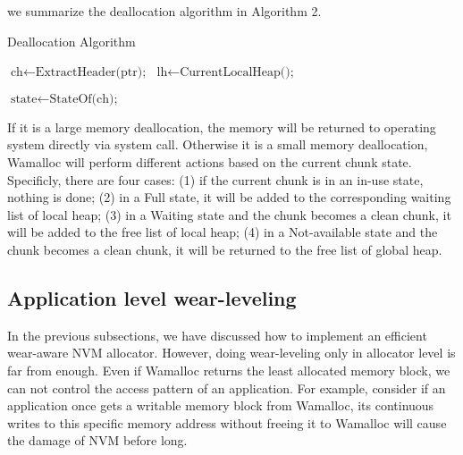 \documentclass{vldb}
\begin{document}
we summarize the deallocation algorithm in Algorithm 2.

\begin{algorithm}
\caption{Deallocation Algorithm}\label{euclid}
\begin{algorithmic}[1]

\State $\text{ch} \gets \text{ExtractHeader(ptr);}$
\State $\text{lh} \gets \text{CurrentLocalHeap();}$

\State {}
\Else
\State {}
\State $\text{state} \gets \text{StateOf(ch);}$

    \State {}
    \State {}
        \State {}
    \EndIf
{}
        \State {}
    \EndIf
\Else
    \State {}
\EndIf
\EndIf

\EndProcedure
\end{algorithmic}
\end{algorithm}

If it is a large memory deallocation, the memory will be returned to operating system directly via system call.
Otherwise it is a small memory deallocation, Wamalloc will perform different actions based on the current chunk state.
Specificly, there are four cases:
(1) if the current chunk is in an in-use state, nothing is done;
(2) in a Full state, it will be added to the corresponding waiting list of local heap;
(3) in a Waiting state and the chunk becomes a clean chunk, it will be added to the free list of local heap;
(4) in a Not-available state and the chunk becomes a clean chunk, it will be returned to the free list of global heap.

\subsection{Application level wear-leveling}

In the previous subsections, we have discussed how to implement an efficient wear-aware NVM allocator.
However, doing wear-leveling only in allocator level is far from enough.
Even if Wamalloc returns the least allocated memory block, we can not control the access pattern of an application.  
For example, consider if an application once gets a writable memory block from Wamalloc,
its continuous writes to this specific memory address without freeing it to Wamalloc will cause the damage of NVM before long.
\end{document}
